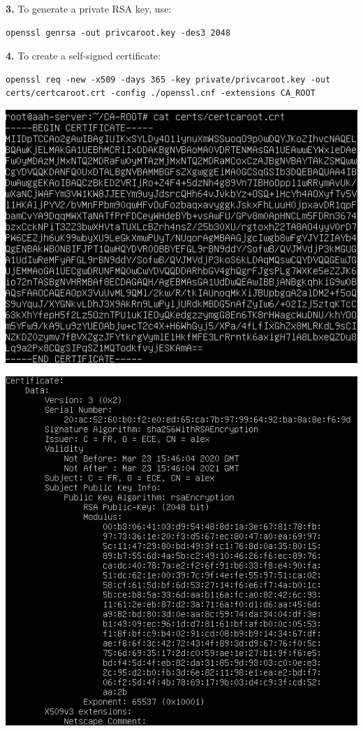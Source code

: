 \documentclass[12pt]{extarticle}
\begin{document}
\textbf{3.} To generate a private RSA key, use:
\begin{verbatim}
openssl genrsa -out privcaroot.key -des3 2048
\end{verbatim}

\textbf{4.} To create a self-signed certificate:
\begin{verbatim}
openssl req -new -x509 -days 365 -key private/privcaroot.key -out
certs/certcaroot.crt -config ./openssl.cnf -extensions CA_ROOT
\end{verbatim}
\begin{center}
\includegraphics[scale=0.7]{resources/2-2-4.png}\\
\end{center}
\begin{center}
\includegraphics[scale=0.7]{resources/2-2-5.png}\\
\end{center}
\end{document}
